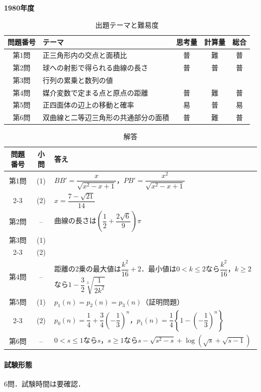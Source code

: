 \documentclass[../../main.tex]{subfiles}
\begin{document}
\begin{center}
  {\fontsize{48pt}{58pt}\selectfont \textbf{1980}\normalsize\textbf{年度}}
\end{center}

\begin{table}[htb]
  \centering
  \caption{出題テーマと難易度}
  \begin{tabular}{|c|p{6.2cm}|c|c|c|}
    \hline
    \textbf{問題番号} & \textbf{テーマ} & \textbf{思考量} & \textbf{計算量} & \textbf{総合} \\
    \hline
    第1問 & 正三角形内の交点と面積比 & 普 & 難 & 普 \\
    \hline
    第2問 & 球への射影で得られる曲線の長さ & 普 & 普 & 普 \\
    \hline
    第3問 & 行列の累乗と数列の値 &  &  &  \\
    \hline
    第4問 & 媒介変数で定まる点と原点の距離 & 普 & 難 & 普 \\
    \hline
    第5問 & 正四面体の辺上の移動と確率 & 易 & 普 & 易 \\
    \hline
    第6問 & 双曲線と二等辺三角形の共通部分の面積 & 普 & 難 & 普 \\
    \hline
  \end{tabular}
\end{table}

\begin{table}[htb]
  \centering
  \caption{解答}
  \renewcommand{\arraystretch}{1.4}
  \begin{tabular}{|c|c|p{9cm}|}
    \hline
    \textbf{問題番号} & \textbf{小問} & \textbf{答え} \\
    \hline
    第1問 & (1) & $BB'=\dfrac{x}{\sqrt{x^2-x+1}}$，$PB'=\dfrac{x^2}{\sqrt{x^2-x+1}}$ \\
    \cline{2-3}
    & (2) & $x=\dfrac{7-\sqrt{21}}{14}$ \\
    \hline
    第2問 & -- & 曲線の長さは$\left(\dfrac{1}{2}+\dfrac{2\sqrt{6}}{9}\right)\pi$ \\
    \hline
    第3問 & (1) & \\
    \cline{2-3}
    & (2) & \\
    \hline
    第4問 & -- & 距離の2乗の最大値は$\dfrac{k^2}{16}+2$．最小値は$0<k\le2$なら$\dfrac{k^2}{16}$，$k\ge2$なら$1-\dfrac{3}{2}\sqrt[3]{\dfrac{1}{2k^2}}$ \\
    \hline
    第5問 & (1) & $p_1(n)=p_2(n)=p_3(n)$（証明問題） \\
    \cline{2-3}
    & (2) & $p_0(n)=\dfrac{1}{4}+\dfrac{3}{4}\left(-\dfrac{1}{3}\right)^n$，$p_1(n)=\dfrac{1}{4}\left\{1-\left(-\dfrac{1}{3}\right)^n\right\}$ \\
    \hline
    第6問 & -- & $0<s\le1$なら$s$，$s\ge1$なら$s-\sqrt{s^2-s}+\log\left(\sqrt{s}+\sqrt{s-1}\right)$ \\
    \hline
  \end{tabular}
\end{table}

\paragraph{試験形態}
6問．試験時間は要確認．
\end{document}

